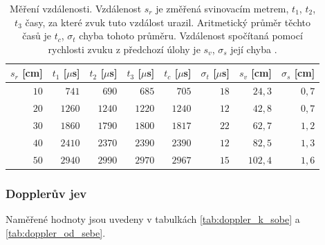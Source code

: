 \documentclass[english]{article}
\begin{document}
	\begin{table}[h]
	\begin{center}
	\begin{tabular}{|r|r|r|r|r|r|r|r|}
	\hline
     $s_r$ [cm] & $t_1$ [$\mu$s] & $t_2$ [$\mu$s] & $t_3$ [$\mu$s] & $t_c$ [$\mu$s] & $\sigma_t$ [$\mu$s] & $s_v$ [cm] & $\sigma_s$ [cm] \\\hline \hline
     $10$ & $741$ & $690$ & $685$ & $705$ & $18$ & $24,3$ & $0,7$ \\\hline
     $20$ & $1260$ & $1240$ & $1220$ & $1240$ & $12$ & $42,8$ & $0,7$ \\\hline
     $30$ & $1860$ & $1790$ & $1800$ & $1817$ & $22$ & $62,7$ & $1,2$ \\\hline
     $40$ & $2410$ & $2370$ & $2390$ & $2390$ & $12$ & $82,5$ & $1,3$ \\\hline
     $50$ & $2940$ & $2990$ & $2970$ & $2967$ & $15$ & $102,4$ & $1,6$ \\\hline
	
	\end{tabular}
	\caption{Měření vzdálenosti. Vzdálenost $s_r$ je změřená svinovacím metrem, $t_1$, $t_2$, $t_3$ časy, za které zvuk tuto vzdálost urazil. Aritmetický průměr těchto časů je $t_c$, $\sigma_t$ chyba tohoto průměru. Vzdálenost spočítaná pomocí rychlosti zvuku z předchozí úlohy je $s_v$, $\sigma_s$ její chyba \cite{bib:chyby}.}
	\label{tab:mereni_vzdalenosti}
	\end{center}
	\end{table}

	\subsubsection{Dopplerův jev}
		Naměřené hodnoty jsou uvedeny v tabulkách \ref{tab:doppler_k_sobe} a \ref{tab:doppler_od_sebe}.
		
\end{document}
